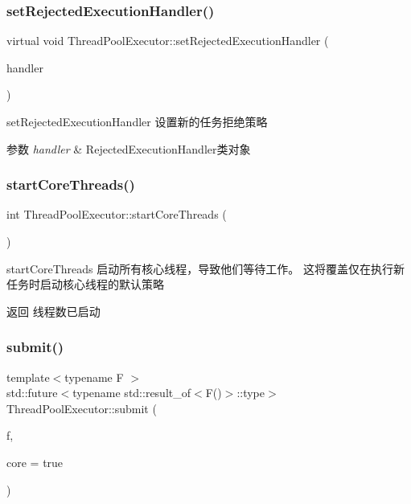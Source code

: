 \subsubsection{\texorpdfstring{set\+Rejected\+Execution\+Handler()}{setRejectedExecutionHandler()}}
{\footnotesize\ttfamily virtual void Thread\+Pool\+Executor\+::set\+Rejected\+Execution\+Handler (\begin{DoxyParamCaption}\item[{\hyperlink{classRejectedExecutionHandler}{Rejected\+Execution\+Handler}}]{handler }\end{DoxyParamCaption})\hspace{0.3cm}{\ttfamily [virtual]}}



set\+Rejected\+Execution\+Handler 设置新的任务拒绝策略 


\begin{DoxyParams}{参数}
{\em handler} & Rejected\+Execution\+Handler类对象 \\
\hline
\end{DoxyParams}
\mbox{\label{classThreadPoolExecutor_a560e912bb988292e81d16274e3d4a5d8}} 
\subsubsection{\texorpdfstring{start\+Core\+Threads()}{startCoreThreads()}}
{\footnotesize\ttfamily int Thread\+Pool\+Executor\+::start\+Core\+Threads (\begin{DoxyParamCaption}{ }\end{DoxyParamCaption})}



start\+Core\+Threads 启动所有核心线程，导致他们等待工作。 这将覆盖仅在执行新任务时启动核心线程的默认策略 

\begin{DoxyReturn}{返回}
线程数已启动 
\end{DoxyReturn}
\mbox{\label{classThreadPoolExecutor_a94834ab6bedcc75111524fec4e928b3f}} 
\subsubsection{\texorpdfstring{submit()}{submit()}}
{\footnotesize\ttfamily template$<$typename F $>$ \\
std\+::future$<$typename std\+::result\+\_\+of$<$F()$>$\+::type$>$ Thread\+Pool\+Executor\+::submit (\begin{DoxyParamCaption}\item[{F}]{f,  }\item[{bool}]{core = {\ttfamily true} }\end{DoxyParamCaption})\hspace{0.3cm}{\ttfamily [inline]}}



